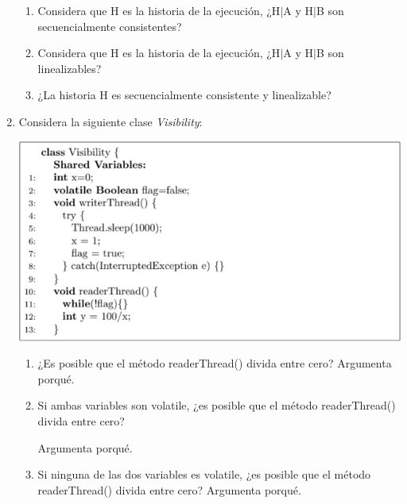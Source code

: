 \begin{enumerate}
    \begin{enumerate}
        \item Considera que H es la historia de la ejecución, ¿H$\vert$A y H$\vert$B son secuencialmente consistentes?

        \item Considera que H es la historia de la ejecución, ¿H$\vert$A y H$\vert$B son linealizables?

        \item ¿La historia H es secuencialmente consistente y linealizable?
    \end{enumerate}

    \item Considera la siguiente clase \textit{Visibility}:

    \begin{center}
        \includegraphics[width = 12 cm]{Images/Pregunta5_3.png}
    \end{center}

    \begin{enumerate}
        \item ¿Es posible que el método readerThread() divida entre cero? Argumenta porqué.

        \item Si ambas variables son volatile, ¿es posible que el método readerThread() divida entre cero?
        
        Argumenta porqué.

        \item Si ninguna de las dos variables es volatile, ¿es posible que el método readerThread() divida entre cero? Argumenta porqué.
    \end{enumerate}
    
\end{enumerate}
